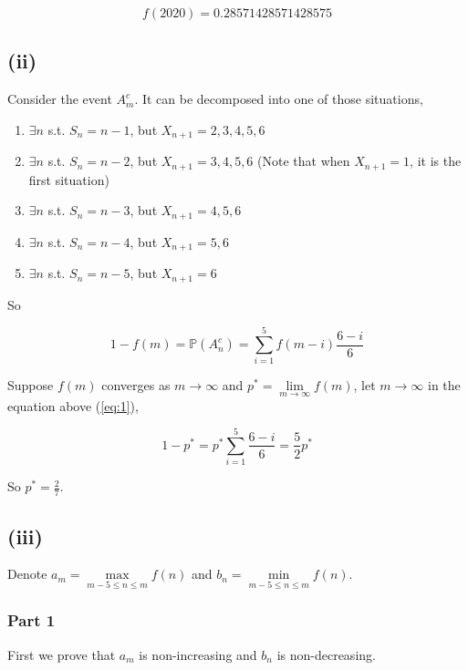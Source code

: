\documentclass{article}
\begin{document}
\begin{equation}
    f(2020) = 0.28571428571428575
\end{equation}


\subsection{(ii)}

Consider the event $A_m^c$. It can be decomposed into one of those situations,

\begin{enumerate}
    \item $\exists n$ s.t. $S_n = n-1$, but $X_{n+1} = 2,3,4,5,6$
    \item $\exists n$ s.t. $S_n = n-2$, but $X_{n+1} = 3,4,5,6$ (Note that when $X_{n+1} = 1$, it is the first situation)
    \item $\exists n$ s.t. $S_n = n-3$, but $X_{n+1} = 4,5,6$
    \item $\exists n$ s.t. $S_n = n-4$, but $X_{n+1} = 5,6$
    \item $\exists n$ s.t. $S_n = n-5$, but $X_{n+1} = 6$
\end{enumerate}

So 

\begin{equation}\label{eq:1} 
    1-f(m) = \mathbb{P}(A_n^c) = \sum_{i=1}^5 f(m-i) \frac {6-i}{6}
\end{equation}

Suppose $f(m)$ converges as $m\to\infty$ and $p^* = \lim\limits_{m\to\infty}f(m)$, let $m\to\infty$ in the equation above (\ref{eq:1}),

\begin{equation}
    1-p^* = p^* \sum_{i=1}^5 \frac {6-i}{6} = \frac 5 2 p^*
\end{equation}

So $p^* = \frac 2 7$.


\subsection{(iii)}

Denote $a_m = \max\limits_{m-5 \leqslant n\leqslant m}f(n)$ and $b_n = \min\limits_{m-5 \leqslant n\leqslant m}f(n)$. 

\subsubsection*{Part 1}

First we prove that $a_m$ is non-increasing and $b_n$ is non-decreasing.
\end{document}
